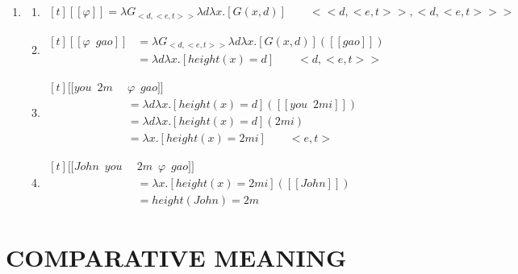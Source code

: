 \documentclass{ctexart}
\begin{document}
\begin{enumerate}
    \item \label{assignable_example_lambda}
    \begin{enumerate}
        \item \label{assignable_example_lambda_a}
        $\begin{aligned}[t]
            [\![\varphi]\!] = \lambda G_{<d,<e,t>>} \lambda d \lambda x.[G(x,d)] \qquad <<d,<e,t>>,<d,<e,t>>>
        \end{aligned}$

        \item \label{assignable_example_lambda_b}
        $\begin{aligned}[t]
            [\![\varphi \enspace gao]\!] 
            &= \lambda G_{<d,<e,t>>} \lambda d \lambda x.[G(x,d)]([\![gao]\!]) \\
            &= \lambda d \lambda x.[height(x) = d] \qquad <d,<e,t>>
        \end{aligned}$

        \item \label{assignable_example_lambda_c}
        $\begin{aligned}[t]
            [\![you \enspace 2m \enspace &\varphi \enspace gao]\!] \\
            &= \lambda d \lambda x.[height(x) = d]([\![you \enspace 2mi]\!]) \\
            &= \lambda d \lambda x.[height(x) = d](2mi) \\
            &= \lambda x.[height(x) = 2mi] \qquad <e,t>
        \end{aligned}$

        \item \label{assignable_example_lambda_d}
        $\begin{aligned}[t]
            [\![John \enspace you \enspace &2m \enspace \varphi \enspace gao]\!] \\
            &= \lambda x.[height(x) = 2mi]([\![John]\!]) \\
            &= height(John)=2m
        \end{aligned}$
        
    \end{enumerate}
\end{enumerate}

\section{COMPARATIVE MEANING}
\end{document}
